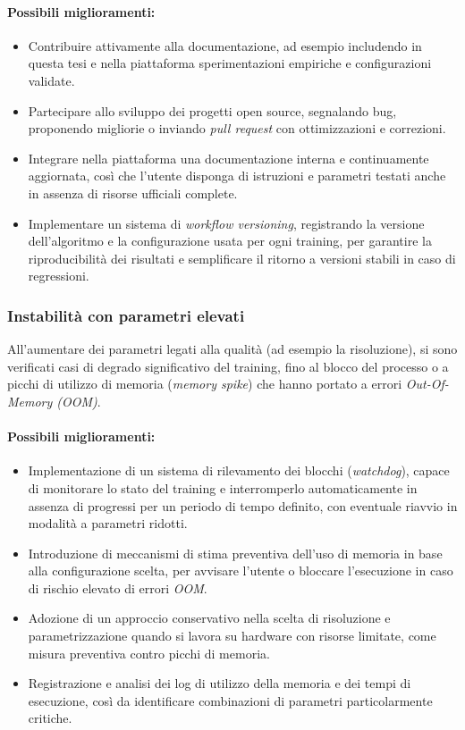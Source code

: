 \paragraph{Possibili miglioramenti:}
\begin{itemize}
	\item Contribuire attivamente alla documentazione, ad esempio includendo in questa tesi e nella piattaforma sperimentazioni empiriche e configurazioni validate.
	\item Partecipare allo sviluppo dei progetti open source, segnalando bug, proponendo migliorie o inviando \emph{pull request} con ottimizzazioni e correzioni.
	\item Integrare nella piattaforma una documentazione interna e continuamente aggiornata, così che l'utente disponga di istruzioni e parametri testati anche in assenza di risorse ufficiali complete.
	\item Implementare un sistema di \emph{workflow versioning}, registrando la versione dell'algoritmo e la configurazione usata per ogni training, per garantire la riproducibilità dei risultati e semplificare il ritorno a versioni stabili in caso di regressioni.
\end{itemize}


\subsubsection{Instabilità con parametri elevati}
All'aumentare dei parametri legati alla qualità (ad esempio la risoluzione), si sono verificati casi di degrado significativo del training, fino al blocco del processo o a picchi di utilizzo di memoria (\emph{memory spike}) che hanno portato a errori \emph{Out-Of-Memory (OOM)}.

\paragraph{Possibili miglioramenti:}
\begin{itemize}
	\item Implementazione di un sistema di rilevamento dei blocchi (\emph{watchdog}), capace di monitorare lo stato del training e interromperlo automaticamente in assenza di progressi per un periodo di tempo definito, con eventuale riavvio in modalità a parametri ridotti.
	\item Introduzione di meccanismi di stima preventiva dell'uso di memoria in base alla configurazione scelta, per avvisare l'utente o bloccare l'esecuzione in caso di rischio elevato di errori \emph{OOM}.
	\item Adozione di un approccio conservativo nella scelta di risoluzione e parametrizzazione quando si lavora su hardware con risorse limitate, come misura preventiva contro picchi di memoria.
	\item Registrazione e analisi dei log di utilizzo della memoria e dei tempi di esecuzione, così da identificare combinazioni di parametri particolarmente critiche.
\end{itemize}

